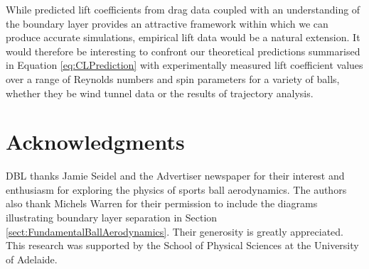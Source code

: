 \documentclass[a4paper]{article}
\begin{document}
While predicted lift coefficients from drag data coupled with an understanding of the boundary layer provides an attractive framework within which we can produce accurate simulations, empirical lift data would be a natural extension.
It would therefore be interesting to confront our theoretical predictions summarised in Equation \ref{eq:CLPrediction} with experimentally measured lift coefficient values over a range of Reynolds numbers and spin parameters for a variety of balls, whether they be wind tunnel data or the results of trajectory analysis.


\section*{Acknowledgments}
DBL thanks Jamie Seidel and the Advertiser newspaper for their interest and enthusiasm for exploring the physics of sports ball aerodynamics.
The authors also thank Michels Warren for their permission to include the diagrams illustrating boundary layer separation in Section \ref{sect:FundamentalBallAerodynamics}.  Their generosity is greatly appreciated.  This research was supported by the School of Physical Sciences at the University of Adelaide.
\end{document}

